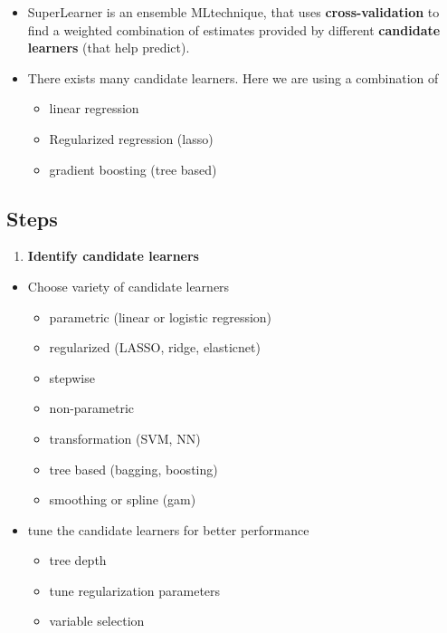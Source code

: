 \documentclass[
]{book}
\providecommand{\tightlist}{%
  \setlength{\itemsep}{0pt}\setlength{\parskip}{0pt}}
\begin{document}
\begin{itemize}
\tightlist
\item
  SuperLearner is an ensemble MLtechnique, that uses \textbf{cross-validation} to find a weighted combination of estimates provided by different \textbf{candidate learners} (that help predict).
\item
  There exists many candidate learners. Here we are using a combination of

  \begin{itemize}
  \tightlist
  \item
    linear regression
  \item
    Regularized regression (lasso)
  \item
    gradient boosting (tree based)
  \end{itemize}
\end{itemize}

\hypertarget{steps-1}{%
\subsection{Steps}\label{steps-1}}

\begin{enumerate}
\def\labelenumi{\arabic{enumi}.}
\tightlist
\item
  \textbf{Identify candidate learners}
\end{enumerate}

\begin{itemize}
\tightlist
\item
  Choose variety of candidate learners

  \begin{itemize}
  \tightlist
  \item
    parametric (linear or logistic regression)
  \item
    regularized (LASSO, ridge, elasticnet)
  \item
    stepwise
  \item
    non-parametric
  \item
    transformation (SVM, NN)
  \item
    tree based (bagging, boosting)
  \item
    smoothing or spline (gam)
  \end{itemize}
\item
  tune the candidate learners for better performance

  \begin{itemize}
  \tightlist
  \item
    tree depth
  \item
    tune regularization parameters
  \item
    variable selection
  \end{itemize}
\end{itemize}
\end{document}
